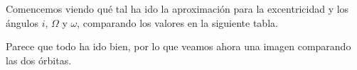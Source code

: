\documentclass[11pt]{book}
\begin{document}
Comencemos viendo qué tal ha ido la aproximación para la excentricidad y los ángulos $i$, $\Omega$ y $\omega$, comparando los valores en la siguiente tabla.
\begin{table}[H]
\centering
{}
\end{table}

Parece que todo ha ido bien, por lo que veamos ahora una imagen comparando las dos órbitas.
\end{document}
